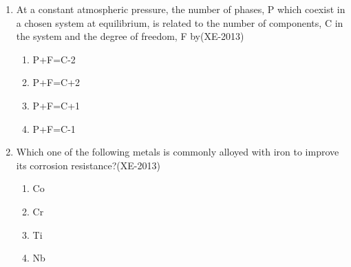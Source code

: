 \documentclass[journal]{IEEEtran}
\numberwithin{equation}{enumi}
\numberwithin{figure}{enumi}
\begin{document}
\begin{enumerate}
\begin{enumerate}
\end{enumerate}
\item At a constant atmospheric pressure, the number of phases, P which coexist in a chosen system at equilibrium, is related to the number of components, C in the system and the degree of freedom, F
by\hfill(XE-2013)
\begin{enumerate}
    \item P+F=C-2
    \item P+F=C+2
    \item P+F=C+1
    \item P+F=C-1
\end{enumerate}
\item Which one of the following metals is commonly alloyed with iron to improve its corrosion resistance?\hfill(XE-2013)
\begin{enumerate}
    \item Co
    \item Cr
    \item Ti
    \item Nb
    

\end{enumerate}
\end{enumerate}
\end{document}
